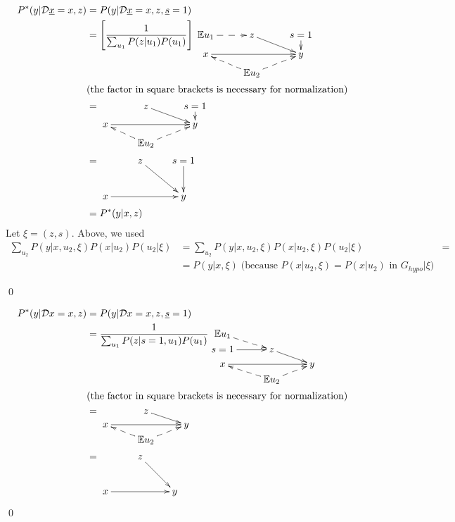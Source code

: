\begin{claim}
\label{cl-decTransferTrivial}
\decTransferTrivial
\end{claim}
\proof
\begin{align}
P^*(y|\cald \rvx=x, z) &=
P(y|\cald\rvx=x, z, \rvs=1)
\\
&=
\left[\frac{1}{\sum_{u_1}P(z|u_1)P(u_1)}\right]
\xymatrix@R=.5pc{
\EE u_1\ar@{-->}[r]
&z\ar[rd]
&s=1\ar[d]
\\
x\ar[rr]
&&y
\\
&\EE u_2\ar@{-->}[ul]\ar@{-->}[ur]
}
\\
& \text{(the factor in square brackets is necessary for normalization)}\nonumber
\\
&=
\xymatrix@R=.5pc{
&z\ar[rd]
&s=1\ar[d]
\\
x\ar[rr]
&&y
\\
&\EE u_2\ar@{-->}[ul]\ar@{-->}[ur]
}
\\
&=
\xymatrix{
&z\ar[rd]
&s=1\ar[d]
\\
x\ar[rr]
&&y}
\\
&=
P^*(y|x,z)
\end{align}
Let $\xi=(z,s)$. Above, we used 
\begin{align}
\sum_{u_2}P(y|x, u_2,\xi)P(x|u_2)P(u_2|\xi)
&=
\sum_{u_2}P(y|x, u_2,\xi)P(x|u_2, \xi)P(u_2|\xi)&=
\\&=
P(y|x, \xi)
\;\text{(because $P(x|u_2, \xi)=P(x|u_2)$ in $G_{hypo}|\xi$)}
\end{align}

\qed

\begin{claim}
\label{cl-decTransferDirect}
\decTransferDirect
\end{claim}
\proof
\begin{align}
P^*(y|\cald x=x,z) &=
P(y|\cald x=x,z, \rvs=1)
\\
&=
\frac{1}{\sum_{u_1}P(z|s=1, u_1)P(u_1)}
\xymatrix@R=.2pc{
\EE u_1\ar@{-->}[dr]
\\
s=1\ar[r]
&z\ar[rd]
&
\\
x\ar[rr]
&&y
\\
&\EE u_2\ar@{-->}[ur]\ar@{-->}[ul]
}\\
& \text{(the factor in square brackets is necessary for normalization)}\nonumber
\\
&=
\xymatrix@R=.2pc{
&z\ar[rd]
&
\\
x\ar[rr]
&&y
\\
&\EE u_2\ar@{-->}[ur]\ar@{-->}[ul]
}
\\
&=
\xymatrix{
&z\ar[rd]
&
\\
x\ar[rr]
&&y
}
\end{align}
\qed

